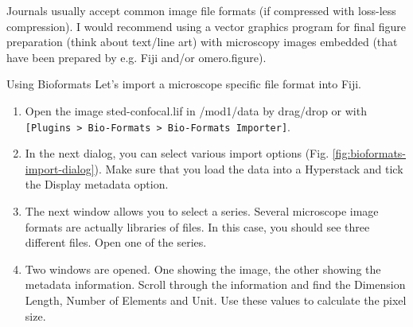 Journals usually accept common image file formats (if compressed with
loss-less compression). I would recommend using a vector graphics
program for final figure preparation (think about text/line art) with
microscopy images embedded (that have been prepared by e.g. Fiji and/or omero.figure).

\begin{taskbox}{Using Bioformats}
Let's import a microscope specific file format into Fiji.

\begin{enumerate}
	\item Open the image sted-confocal.lif in /mod1/data by drag/drop or with \texttt{[Plugins > Bio-Formats > Bio-Formats Importer]}.  
	\item In the next dialog, you can select various import options (Fig. \ref{fig:bioformats-import-dialog}). Make sure that you load the data into a Hyperstack and tick the Display metadata option.
	
	\begin{minipage}[t]{\linewidth}
		\begin{center}
		\medskip
		\label{fig:bioformats-import-dialog}
		\end{center}
	\end{minipage}
	
	\item The next window allows you to select a series. Several microscope image formats are actually libraries of files. In this case, you should see three different files. Open one of the series.
	\item Two windows are opened. One showing the image, the other showing the metadata information. Scroll through the information and find the Dimension Length, Number of Elements and Unit. Use these values to calculate the pixel size.
\end{enumerate}

\end{taskbox}

